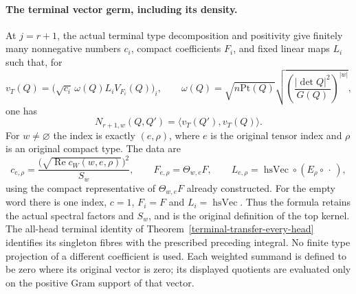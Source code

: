 \paragraph{The terminal vector germ, including its density.}
At $j=r+1$, the actual terminal type decomposition and positivity
give finitely many nonnegative numbers $c_i$, compact coefficients
$F_i$, and fixed linear maps $L_i$ such that, for
\[
 v_T(Q)=\bigl(\sqrt{c_i}\,\omega(Q)L_iV_{F_i}(Q)\bigr)_i,
 \qquad
 \omega(Q)=\sqrt{n\mathrm{Pt}(Q)}
          \sqrt{\left(\frac{|\det Q|^2}{G(Q)}\right)^{|w|}},
\]
one has
\begin{equation}\label{block-growth-top-gram}
              N_{r+1,w}(Q,Q')=\langle v_T(Q'),v_T(Q)\rangle.
\end{equation}
For $w\ne\varnothing$ the index is exactly $(e,\rho)$, where
$e$ is the original tensor index and $\rho$ is an original compact
type.  The data are
\[
 c_{e,\rho}=\frac{\bigl(\sqrt{\operatorname{Re}c_W(w,e,\rho)}\bigr)^2}{S_w},
 \qquad F_{e,\rho}=\Theta_{w,e}F,\qquad
 L_{e,\rho}=\operatorname{hsVec}\circ(E_\rho\circ\,\cdot\,),
\]
using the compact representative of $\Theta_{w,e}F$ already
constructed.  For the empty word there is one index, $c=1$,
$F_i=F$ and $L_i=\operatorname{hsVec}$.  Thus the formula retains
the actual spectral factors and $S_w$, and is the original
definition of the top kernel.  The all-head terminal identity
of Theorem~\ref{terminal-transfer-every-head} identifies its
singleton fibres with the prescribed preceding integral.
No finite type projection of a different coefficient is used.
Each weighted summand is defined to be zero where its original
vector is zero; its displayed quotients are evaluated only on
the positive Gram support of that vector.

